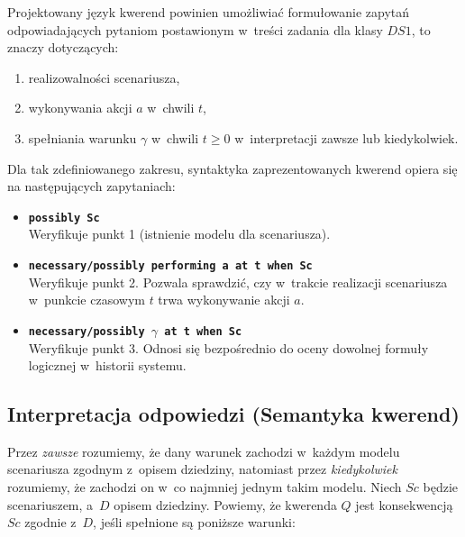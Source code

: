 \documentclass[12pt,a4paper]{article}
\begin{document}
Projektowany język kwerend powinien umożliwiać formułowanie zapytań odpowiadających pytaniom postawionym w~treści zadania dla klasy $DS1$, to znaczy dotyczących:
\begin{enumerate}[label=\arabic*.]
    \item realizowalności scenariusza,
    \item wykonywania akcji $a$ w~chwili $t$,
    \item spełniania warunku $\gamma$ w~chwili $t \ge 0$ w~interpretacji zawsze lub kiedykolwiek.
\end{enumerate}

Dla tak zdefiniowanego zakresu, syntaktyka zaprezentowanych kwerend opiera się na następujących zapytaniach:
\begin{itemize}
    \item \textbf{\texttt{possibly Sc}} \\
    Weryfikuje punkt 1 (istnienie modelu dla scenariusza).
    \item \textbf{\texttt{necessary/possibly performing a at t when Sc}} \\
    Weryfikuje punkt 2. Pozwala sprawdzić, czy w~trakcie realizacji scenariusza w~punkcie czasowym $t$ trwa wykonywanie akcji $a$.
    \item \textbf{\texttt{necessary/possibly $\gamma$ at t when Sc}} \\
    Weryfikuje punkt 3. Odnosi się bezpośrednio do oceny dowolnej formuły logicznej w~historii systemu.
\end{itemize}

\subsection{Interpretacja odpowiedzi (Semantyka kwerend)}

Przez \emph{zawsze} rozumiemy, że dany warunek zachodzi w~każdym modelu scenariusza zgodnym z~opisem dziedziny, natomiast przez \emph{kiedykolwiek} rozumiemy, że zachodzi on w~co najmniej jednym takim modelu. Niech $Sc$ będzie scenariuszem, a~$D$ opisem dziedziny. Powiemy, że kwerenda $Q$ jest konsekwencją $Sc$ zgodnie z~$D$, jeśli spełnione są poniższe warunki:
\end{document}
